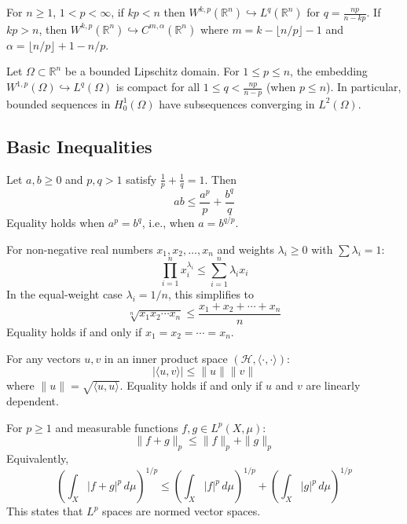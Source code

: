 \begin{example}
For $n \geq 1$, $1 < p < \infty$, if $kp < n$ then $W^{k,p}(\mathbb{R}^n) \hookrightarrow L^q(\mathbb{R}^n)$ for $q = \frac{np}{n-kp}$. If $kp > n$, then $W^{k,p}(\mathbb{R}^n) \hookrightarrow C^{m,\alpha}(\mathbb{R}^n)$ where $m = k - \lfloor n/p \rfloor - 1$ and $\alpha = \lfloor n/p \rfloor + 1 - n/p$.
\end{example}

\begin{example}
Let $\Omega \subset \mathbb{R}^n$ be a bounded Lipschitz domain. For $1 \leq p \leq n$, the embedding $W^{1,p}(\Omega) \hookrightarrow L^q(\Omega)$ is compact for all $1 \leq q < \frac{np}{n-p}$ (when $p \leq n$). In particular, bounded sequences in $H_0^1(\Omega)$ have subsequences converging in $L^2(\Omega)$.
\end{example}

\subsection{Basic Inequalities}

\begin{example}
Let $a, b \geq 0$ and $p, q > 1$ satisfy $\frac{1}{p} + \frac{1}{q} = 1$. Then
\[ ab \leq \frac{a^p}{p} + \frac{b^q}{q} \]
Equality holds when $a^p = b^q$, i.e., when $a = b^{q/p}$.
\end{example}

\begin{example}[AM-GM Inequality]
For non-negative real numbers $x_1, x_2, \ldots, x_n$ and weights $\lambda_i \geq 0$ with $\sum \lambda_i = 1$:
\[ \prod_{i=1}^n x_i^{\lambda_i} \leq \sum_{i=1}^n \lambda_i x_i \]
In the equal-weight case $\lambda_i = 1/n$, this simplifies to
\[ \sqrt[n]{x_1 x_2 \cdots x_n} \leq \frac{x_1 + x_2 + \cdots + x_n}{n} \]
Equality holds if and only if $x_1 = x_2 = \cdots = x_n$.
\end{example}

\begin{example}
For any vectors $u, v$ in an inner product space $(\mathcal{H}, \langle \cdot, \cdot \rangle)$:
\[ |\langle u, v \rangle| \leq \|u\| \|v\| \]
where $\|u\| = \sqrt{\langle u, u \rangle}$. Equality holds if and only if $u$ and $v$ are linearly dependent.
\end{example}

\begin{example}
For $p \geq 1$ and measurable functions $f, g \in L^p(X, \mu)$:
\[ \|f + g\|_p \leq \|f\|_p + \|g\|_p \]
Equivalently,
\[ \left( \int_X |f + g|^p \, d\mu \right)^{1/p} \leq \left( \int_X |f|^p \, d\mu \right)^{1/p} + \left( \int_X |g|^p \, d\mu \right)^{1/p} \]
This states that $L^p$ spaces are normed vector spaces.
\end{example}

